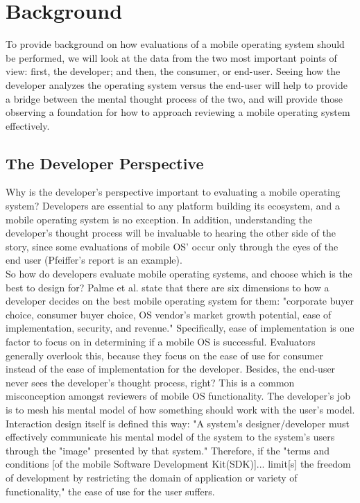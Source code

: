 \documentclass[11pt]{article}
\begin{document}
\section{Background}
To provide background on how evaluations of a mobile operating system should be performed, we will look at the data from the two most important points of view: first, the developer; and then, the consumer, or end-user. Seeing how the developer analyzes the operating system versus the end-user will help to provide a bridge between the mental thought process of the two, and will provide those observing a foundation for how to approach reviewing a mobile operating system effectively.
\subsection{The Developer Perspective}
Why is the developer's perspective important to evaluating a mobile operating system? Developers are essential to any platform building its ecosystem, and a mobile operating system is no exception. In addition, understanding the developer's thought process will be invaluable to hearing the other side of the story, since some evaluations of mobile OS' occur only through the eyes of the end user (Pfeiffer's report is an example). \\
\indent So how do developers evaluate mobile operating systems, and choose which is the best to design for? Palme et al. state that there are six dimensions to how a developer decides on the best mobile operating system for them: "corporate buyer choice, consumer buyer choice, OS vendor's market growth potential, ease of implementation, security, and revenue." \cite{Palme} Specifically, ease of implementation is one factor to focus on in determining if a mobile OS is successful. Evaluators generally overlook this, because they focus on the ease of use for consumer instead of the ease of implementation for the developer. Besides, the end-user never sees the developer's thought process, right? This is a common misconception amongst reviewers of mobile OS functionality. The developer's job is to mesh his mental model of how something should work with the user's model. Interaction design itself is defined this way: "A system's designer/developer must effectively communicate his mental model of the system to the system's users through the "image" presented by that system." Therefore, if the "terms and 
conditions [of the mobile Software Development Kit(SDK)]... limit[s] the freedom of development by restricting the domain of application or variety of functionality," the ease of use for the user suffers. \cite{Palme}
\end{document}
